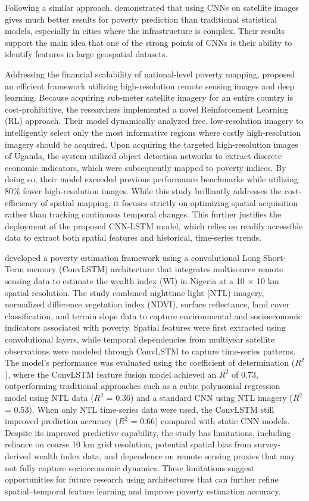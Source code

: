 \documentclass[12pt, letterpaper]{article}
\numberwithin{figure}{section}
\numberwithin{table}{section}
\begin{document}
Following a similar approach, \textcite{Okaidat2021} demonstrated
that using CNNs on satellite images gives much better results for
poverty prediction than traditional statistical models, especially in
cities where the infrastructure is complex. Their results support the
main idea that one of the strong points of CNNs is their ability to
identify features in large geospatial datasets.

Addressing the financial scalability of national-level poverty
mapping, \textcite{Ayush2021} proposed an efficient framework
utilizing high-resolution remote sensing images and deep learning.
Because acquiring sub-meter satellite imagery for an entire country
is cost-prohibitive, the researchers implemented a novel
Reinforcement Learning (RL) approach. Their model dynamically
analyzed free, low-resolution imagery to intelligently select only
the most informative regions where costly high-resolution imagery
should be acquired. Upon acquiring the targeted high-resolution
images of Uganda, the system utilized object detection networks to
extract discrete economic indicators, which were subsequently mapped
to poverty indices. By doing so, their model exceeded previous
performance benchmarks while utilizing 80\% fewer high-resolution
images. While this study brilliantly addresses the cost-efficiency of
spatial mapping, it focuses strictly on optimizing spatial
acquisition rather than tracking continuous temporal changes. This
further justifies the deployment of the proposed CNN-LSTM model,
which relies on readily accessible data to extract both spatial
features and historical, time-series trends.

\textcite{Tang2024} developed a poverty estimation framework using a
convolutional Long Short-Term memory (ConvLSTM) architecture that
integrates multisource remote sensing data to estimate the wealth
index (WI) in Nigeria at a 10 $\times$ 10 km spatial resolution. The
study combined nighttime light (NTL) imagery, normalized difference
vegetation index (NDVI), surface reflectance, land cover
classification, and terrain slope data to capture environmental and
socioeconomic indicators associated with poverty. Spatial features
were first extracted using convolutional layers, while temporal
dependencies from multiyear satellite observations were modeled
through ConvLSTM to capture time-series patterns. The model's
performance was evaluated using the coefficient of determination
($R^2$), where the ConvLSTM feature fusion model achieved an $R^2$ of
0.73, outperforming traditional approaches such as a cubic polynomial
regression model using NTL data ($R^2$ = 0.36) and a standard CNN
using NTL imagery ($R^2$ = 0.53). When only NTL time-series data were
used, the ConvLSTM still improved prediction accuracy ($R^2$ = 0.66)
compared with static CNN models. Despite its improved predictive
capability, the study has limitations, including reliance on coarse
10 km grid resolution, potential spatial bias from survey-derived
wealth index data, and dependence on remote sensing proxies that may
not fully capture socioeconomic dynamics. These limitations suggest
opportunities for future research using architectures that can
further refine spatial–temporal feature learning and improve poverty
estimation accuracy. \parencite{Tang2024}
\end{document}
